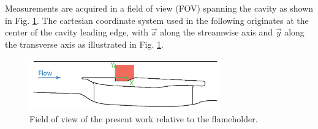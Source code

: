 Measurements are acquired in a field of view (FOV) spanning the cavity as shown in Fig. \ref{fig:ch3_FOVs}. The cartesian coordinate system used in the following originates at the center of the cavity leading edge, with $\vec{x}$ along the streamwise axis and $\vec{y}$ along the transverse axis as illustrated in Fig. \ref{fig:ch3_FOVs}.

\begin{figure}[!hbt]
\centering
\includegraphics[width=3.25in, trim=0.3in 0in 0.57in 0in, clip]{figures/FOVs/aaArtboard2.png} %
\caption{Field of view of the present work relative to the flameholder.}\label{fig:ch3_FOVs}
\end{figure}


